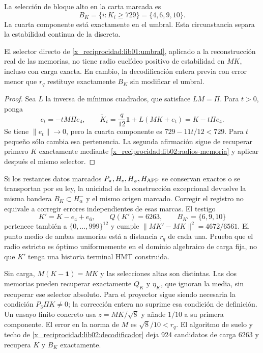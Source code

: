 La selección de bloque alto en la carta marcada es
\begin{equation}
 B_K=\{i:K_i\geq729\}=\{4,6,9,10\}.
 \label{x_reciprocidad:lib01:umbral}
\end{equation}
La cuarta componente está exactamente en el umbral. Esta circunstancia
separa la estabilidad continua de la discreta.

\begin{proposition}
\label{x_reciprocidad:lib01:umbral-estable}
El selector directo de \eqref{x_reciprocidad:lib01:umbral}, aplicado a la reconstrucción
real de las memorias, no tiene radio euclídeo positivo de estabilidad en
\(MK\), incluso con carga exacta. En cambio, la decodificación entera
previa con error menor que \(r_q\) restituye exactamente \(B_K\)
sin modificar el umbral.
\end{proposition}
\begin{proof}
Sea \(L\) la inversa de mínimos cuadrados, que satisface
\(LM=\Pi\). Para \(t>0\), ponga
\[
 e_t=-tM\Pi e_4,
 \qquad \widetilde K_t=\frac q{12}\mathbf1+L(MK+e_t)
 =K-t\Pi e_4.
\]
Se tiene \(\|e_t\|\to0\), pero la cuarta componente es
\(729-11t/12<729\). Para \(t\) pequeño sólo cambia esa pertenencia.
La segunda afirmación sigue de recuperar primero \(K\) exactamente
mediante \cref{x_reciprocidad:lib02:radios-memoria} y aplicar después el mismo selector.
\end{proof}

Si los restantes datos marcados \(P_\pi,H_e,H_\varphi,H_{\rm APP}\)
se conservan exactos o se transportan por su ley, la unicidad de la
construcción excepcional devuelve la misma bandera
\(B_K\subset H^-_\alpha\) y el mismo origen marcado. Corregir el
registro no equivale a corregir errores independientes de esas marcas.
El testigo
\[
 K'=K-e_4+e_6,
 \qquad Q(K')=6263,\qquad B_{K'}=\{6,9,10\}
\]
pertenece también a \(\{0,\ldots,999\}^{12}\) y cumple
\(\|MK'-MK\|^2=4672/6561\). El punto medio de ambas memorias está
a distancia \(r_q\) de cada una. Prueba que el radio estricto es
óptimo uniformemente en el dominio algebraico de carga fija, no que
\(K'\) tenga una historia terminal HMT construida.

Sin carga, \(M(K-\mathbf1)=MK\) y las selecciones altas son distintas.
Las dos memorias pueden recuperar exactamente \(Q_K\) y \(\eta_K\),
que ignoran la media, sin recuperar ese selector absoluto. Para el
proyector sigue siendo necesaria la condición \(P_3\Pi K\ne0\);
la corrección entera no suprime esa condición de definición. Un ensayo
finito concreto usa \(z=MK/\sqrt8\) y añade \(1/10\) a su primera
componente. El error en la norma de \(M\) es \(\sqrt8/10<r_q\).
El algoritmo de suelo y techo de \cref{x_reciprocidad:lib02:decodificador} deja 924
candidatos de carga 6263 y recupera \(K\) y \(B_K\) exactamente.

